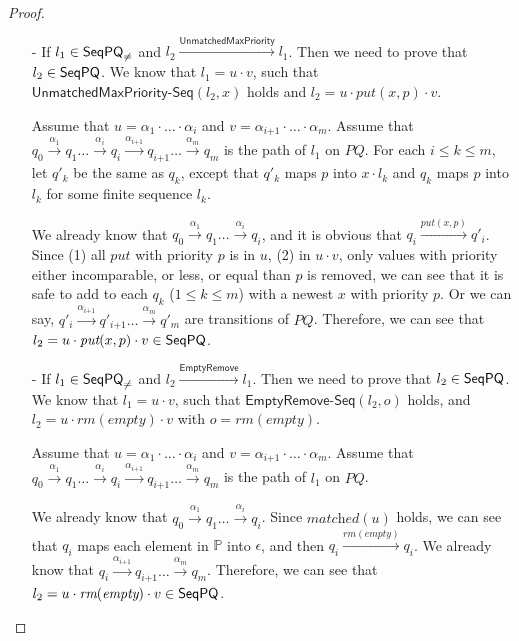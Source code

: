 \begin {proof}
\begin{itemize}
\item[-] If $l_1 \in \mathsf{SeqPQ}_{\neq}$ and $l_2 \xrightarrow{\mathsf{UnmatchedMaxPriority}} l_1$. Then we need to prove that $l_2 \in \mathsf{SeqPQ}$. We know that $l_1 = u \cdot v$, such that $\mathsf{UnmatchedMaxPriority\text{-}Seq}(l_2,x)$ holds and $l_2 = u \cdot \textit{put}(x,p) \cdot v$.

    Assume that $u = \alpha_1 \cdot \ldots \cdot \alpha_i$ and $v = \alpha_{\textit{i+1}} \cdot \ldots \cdot \alpha_m$. Assume that $q_0 \xrightarrow{\alpha_1} q_1 \ldots \xrightarrow{\alpha_i} q_i \xrightarrow{\alpha_{\textit{i+1}}} q_{\textit{i+1}} \ldots  \xrightarrow{\alpha_m} q_m$ is the path of $l_1$ on $\textit{PQ}$. For each $i \leq k \leq m$, let $q'_k$ be the same as $q_k$, except that $q'_k$ maps $p$ into $x \cdot l_k$ and $q_k$ maps $p$ into $l_k$ for some finite sequence $l_k$.

    We already know that $q_0 \xrightarrow{\alpha_1} q_1 \ldots \xrightarrow{\alpha_i} q_i$, and it is obvious that $q_i \xrightarrow{\textit{put}(x,p)} q'_i$. Since (1) all $\textit{put}$ with priority $p$ is in $u$, (2) in $u \cdot v$, only values with priority either incomparable, or less, or equal than $p$ is removed, we can see that it is safe to add to each $q_k$ ($1 \leq k \leq m$) with a newest $x$ with priority $p$. Or we can say, $q'_i \xrightarrow{\alpha_{\textit{i+1}}} q'_{\textit{i+1}} \ldots \xrightarrow{\alpha_m} q'_m$ are transitions of $\textit{PQ}$. Therefore, we can see that $l_2 = u \cdot \textit{put}(x,p) \cdot v \in \mathsf{SeqPQ}$.

\item[-] If $l_1 \in \mathsf{SeqPQ}_{\neq}$ and $l_2 \xrightarrow{\mathsf{EmptyRemove}} l_1$. Then we need to prove that $l_2 \in \mathsf{SeqPQ}$. We know that $l_1 = u \cdot v$, such that $\mathsf{EmptyRemove\text{-}Seq}(l_2,o)$ holds, and $l_2 = u \cdot \textit{rm}(\textit{empty}) \cdot v$ with $o=\textit{rm}(\textit{empty})$.

    Assume that $u = \alpha_1 \cdot \ldots \cdot \alpha_i$ and $v = \alpha_{\textit{i+1}} \cdot \ldots \cdot \alpha_m$. Assume that $q_0 \xrightarrow{\alpha_1} q_1 \ldots \xrightarrow{\alpha_i} q_i \xrightarrow{\alpha_{\textit{i+1}}} q_{\textit{i+1}} \ldots  \xrightarrow{\alpha_m} q_m$ is the path of $l_1$ on $\textit{PQ}$.

    We already know that $q_0 \xrightarrow{\alpha_1} q_1 \ldots \xrightarrow{\alpha_i} q_i$. Since $\textit{matched}(u)$ holds, we can see that $q_i$ maps each element in $\mathbb{P}$ into $\epsilon$, and then $q_i \xrightarrow{\textit{rm}(\textit{empty})} q_i$. We already know that $q_i \xrightarrow{\alpha_{\textit{i+1}}} q_{\textit{i+1}} \ldots \xrightarrow{\alpha_m} q_m$. Therefore, we can see that $l_2 = u \cdot \textit{rm}(\textit{empty}) \cdot v \in \mathsf{SeqPQ}$.
\end{itemize}


\end{proof}
